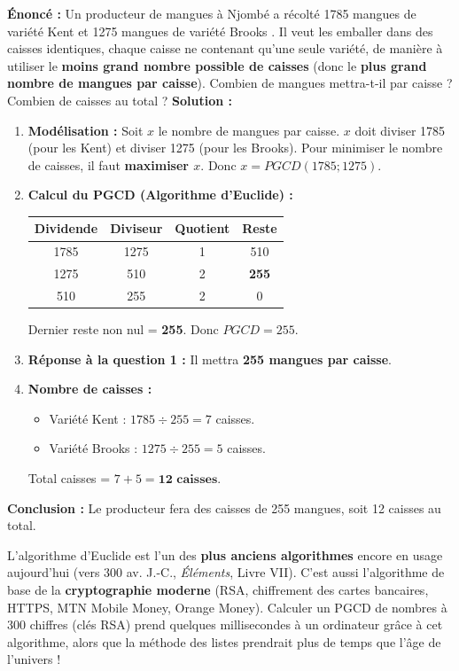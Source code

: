 \documentclass[11pt]{article}
\begin{document}
\begin{exoresolu}
\textbf{Énoncé :} Un producteur de mangues à Njombé a récolté \num{1785} mangues de variété \og Kent \fg{} et \num{1275} mangues de variété \og Brooks \fg{}. Il veut les emballer dans des caisses identiques, chaque caisse ne contenant qu'une seule variété, de manière à utiliser le \textbf{moins grand nombre possible de caisses} (donc le \textbf{plus grand nombre de mangues par caisse}). Combien de mangues mettra-t-il par caisse ? Combien de caisses au total ?
\tcblower
\textbf{Solution :}
\begin{enumerate}
    \item \textbf{Modélisation :} Soit $x$ le nombre de mangues par caisse. $x$ doit diviser 1785 (pour les Kent) et diviser 1275 (pour les Brooks). Pour minimiser le nombre de caisses, il faut \textbf{maximiser $x$}. Donc $x = PGCD(1785;1275)$.
    \item \textbf{Calcul du PGCD (Algorithme d'Euclide) :}
    \begin{center}
    \begin{tabular}{|c|c|c|c|}\hline
    \rowcolor{popblueL} \textbf{Dividende} & \textbf{Diviseur} & \textbf{Quotient} & \textbf{Reste} \\ \hline
    1785 & 1275 & 1 & 510 \\ \hline
    1275 & 510 & 2 & \cellcolor{popgreenL}\textbf{255} \\ \hline
    510 & 255 & 2 & 0 \\ \hline
    \end{tabular}
    \end{center}
    Dernier reste non nul = \textbf{255}. Donc $PGCD = 255$.
    \item \textbf{Réponse à la question 1 :} Il mettra \textbf{255 mangues par caisse}.
    \item \textbf{Nombre de caisses :}
    \begin{itemize}
        \item Variété Kent : $1785 \div 255 = 7$ caisses.
        \item Variété Brooks : $1275 \div 255 = 5$ caisses.
    \end{itemize}
    Total caisses = $7 + 5 = \textbf{12 caisses}$.
\end{enumerate}
\textbf{Conclusion :} Le producteur fera des caisses de 255 mangues, soit 12 caisses au total.
\end{exoresolu}

\begin{savaistu}
L'algorithme d'Euclide est l'un des \textbf{plus anciens algorithmes} encore en usage aujourd'hui (vers 300 av. J.-C., \emph{Éléments}, Livre VII). C'est aussi l'algorithme de base de la \textbf{cryptographie moderne} (RSA, chiffrement des cartes bancaires, HTTPS, MTN Mobile Money, Orange Money). Calculer un PGCD de nombres à 300 chiffres (clés RSA) prend quelques millisecondes à un ordinateur grâce à cet algorithme, alors que la méthode des listes prendrait plus de temps que l'âge de l'univers !
\end{savaistu}
\end{document}

